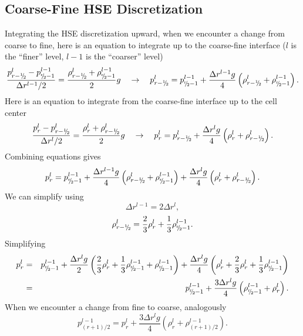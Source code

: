 \subsection{Coarse-Fine HSE Discretization}\label{Sec:Coarse-Fine HSE Discretization}
Integrating the HSE discretization upward, when we encounter a change
from coarse to fine, here is an equation to integrate up to the
coarse-fine interface ($l$ is the ``finer'' level, $l-1$ is the
``coarser'' level)
\begin{equation}
\frac{p_{r-\myhalf}^l - p_{\sfrac{r}{2}-1}^{l-1}}{\Delta r^{l-1}/2} = \frac{\rho_{r-\myhalf}^l + \rho_{\sfrac{r}{2}-1}^{l-1}}{2}g ~~~ \rightarrow ~~~ p_{r-\myhalf}^l = p_{\sfrac{r}{2}-1}^{l-1} + \frac{\Delta r^{l-1} g}{4}\left(\rho_{r-\myhalf}^l + \rho_{\sfrac{r}{2}-1}^{l-1}\right).
\end{equation}
Here is an equation to integrate from the coarse-fine interface up to
the cell center
\begin{equation}
\frac{p_r^l - p_{r-\myhalf}^l}{\Delta r^l/2} = \frac{\rho_r^l + \rho_{r-\myhalf}^l}{2}g ~~~ \rightarrow ~~~ p_r^l = p_{r-\myhalf}^l + \frac{\Delta r^l g}{4}\left(\rho_r^l + \rho_{r-\myhalf}^l\right).
\end{equation}
Combining equations gives
\begin{equation}
p_r^l = p_{\sfrac{r}{2}-1}^{l-1} + \frac{\Delta r^{l-1} g}{4}\left(\rho_{r-\myhalf}^l + \rho_{\sfrac{r}{2}-1}^{l-1}\right) + \frac{\Delta r^l g}{4}\left(\rho_r^l + \rho_{r-\myhalf}^l\right).
\end{equation}
We can simplify using
\begin{equation}
\Delta r^{l-1} = 2\Delta r^l,
\end{equation}
\begin{equation}
\rho_{r-\myhalf}^l = \frac{2}{3}\rho_r^l + \frac{1}{3}\rho_{\sfrac{r}{2}-1}^{l-1}.
\end{equation}
Simplifying
\begin{eqnarray}
p_r^l &=& p_{\sfrac{r}{2}-1}^{l-1} + \frac{\Delta r^l g}{2}\left(\frac{2}{3}\rho_r^l + \frac{1}{3}\rho_{\sfrac{r}{2}-1}^{l-1} + \rho_{\sfrac{r}{2}-1}^{l-1}\right) + \frac{\Delta r^l g}{4}\left(\rho_r^l + \frac{2}{3}\rho_r^l + \frac{1}{3}\rho_{\sfrac{r}{2}-1}^{l-1}\right) \nonumber \\
&=& p_{\sfrac{r}{2}-1}^{l-1} + \frac{3\Delta r^l g}{4}\left(\rho_{\sfrac{r}{2}-1}^{l-1} + \rho_r^l\right).\label{Coarse-Fine Stencil}
\end{eqnarray}
When we encounter a change from fine to coarse, analogously
\begin{equation}
p_{(r+1)/2}^{l-1} = p_{r}^l + \frac{3\Delta r^l g}{4}\left(\rho_{r}^l+\rho_{(r+1)/2}^{l-1}\right).\label{Fine-Coarse Stencil}
\end{equation}


